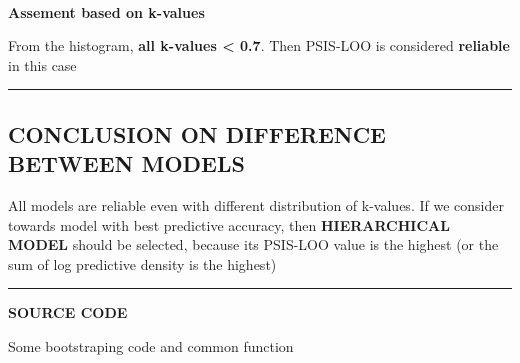 \documentclass[11pt]{article}
\begin{document}
    \begin{center}
    \end{center}
    { \hspace*{\fill} \\}
    
    \textbf{Assement based on k-values}

From the histogram, \textbf{all k-values \textless{} 0.7}. Then PSIS-LOO
is considered \textbf{reliable} in this case

    \begin{center}\rule{0.5\linewidth}{\linethickness}\end{center}

\hypertarget{conclusion-on-difference-between-models}{%
\subsection{CONCLUSION ON DIFFERENCE BETWEEN
MODELS}\label{conclusion-on-difference-between-models}}

All models are reliable even with different distribution of k-values. If
we consider towards model with best predictive accuracy, then
\textbf{HIERARCHICAL MODEL} should be selected, because its PSIS-LOO
value is the highest (or the sum of log predictive density is the
highest)

    \begin{center}\rule{0.5\linewidth}{\linethickness}\end{center}

\textbf{SOURCE CODE}

    Some bootstraping code and common function
\end{document}
